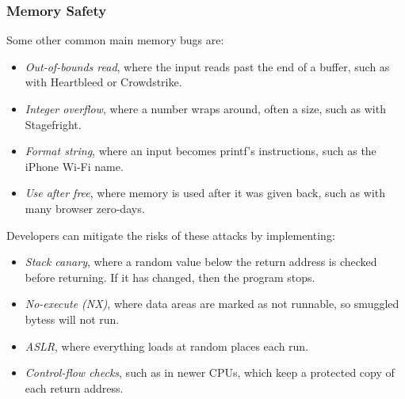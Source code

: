 

\subsubsection{Memory Safety}


Some other common main memory bugs are:
\begin{itemize}
    \item \textit{Out-of-bounds read}, where the input reads past the end of a buffer, such as with Heartbleed or Crowdstrike.
    \item \textit{Integer overflow}, where a number wraps around, often a size, such as with Stagefright.
    \item \textit{Format string}, where an input becomes printf's instructions, such as the iPhone Wi-Fi name.
    \item \textit{Use after free}, where memory is used after it was given back, such as with many browser zero-days. 
\end{itemize}

Developers can mitigate the risks of these attacks by implementing:
\begin{itemize}
    \item \textit{Stack canary}, where a random value below the return address is checked before returning.
        If it has changed, then the program stops.
    \item \textit{No-execute (NX)}, where data areas are marked as not runnable, so smuggled bytess will not run.
    \item \textit{ASLR}, where everything loads at random places each run.
    \item \textit{Control-flow checks}, such as in newer CPUs, which keep a protected copy of each return address.
\end{itemize}


